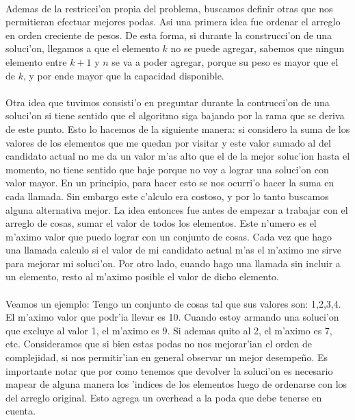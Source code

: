 \paragraph{}
Ademas de la restricci'on propia del problema, buscamos definir otras que nos permitieran efectuar mejores 
podas. Asi una primera idea fue ordenar el arreglo en orden creciente de pesos. De esta forma, si durante 
la construcci'on de una soluci'on, llegamos a que el elemento $k$ no se puede agregar, sabemos que ningun 
elemento entre $k+1$ y $n$ se va a poder agregar, porque su peso es mayor que el de $k$, y por ende mayor 
que la capacidad disponible.
\paragraph{}
Otra idea que tuvimos consisti'o en preguntar durante la contrucci'on de una soluci'on si tiene sentido 
que el algoritmo siga bajando por la rama que se deriva de este punto. Esto lo hacemos de la siguiente 
manera: si considero la suma de los valores de los elementos que me quedan por visitar y este valor 
sumado al del candidato actual no me da un valor m'as alto que el de la mejor soluc'ion hasta el momento, 
no tiene sentido que baje porque no voy a lograr una soluci'on con valor mayor. En un principio, para 
hacer esto se nos ocurri'o hacer la suma en cada llamada. Sin embargo este c'alculo era costoso, y por lo 
tanto buscamos alguna alternativa mejor. La idea entonces fue antes de empezar a trabajar con el arreglo 
de cosas, sumar el valor de todos los elementos. Este n'umero es el m'aximo valor que puedo lograr con 
un conjunto de cosas. Cada vez que hago una llamada calculo si el valor de mi candidato actual m'as el 
m'aximo me sirve para mejorar mi soluci'on. Por otro lado, cuando hago una llamada sin incluir a un 
elemento, resto al m'aximo posible el valor de dicho elemento.\\
\paragraph{}
Veamos un ejemplo: Tengo un conjunto de cosas tal que sus valores son: {1,2,3,4}. El m'aximo valor que podr'ia llevar 
es 10. Cuando estoy armando una soluci'on que excluye al valor 1, el m'aximo es 9. Si ademas quito al 2, 
el m'aximo es 7, etc. Consideramos que si bien estas podas no nos mejorar'ian el orden de complejidad, 
si nos permitir'ian en general observar un mejor desempe\~{n}o. Es importante notar que por como tenemos 
que devolver la soluci'on es necesario mapear de alguna manera los 'indices de los elementos luego de 
ordenarse con los del arreglo original. Esto agrega un overhead a la poda que debe tenerse en cuenta.
